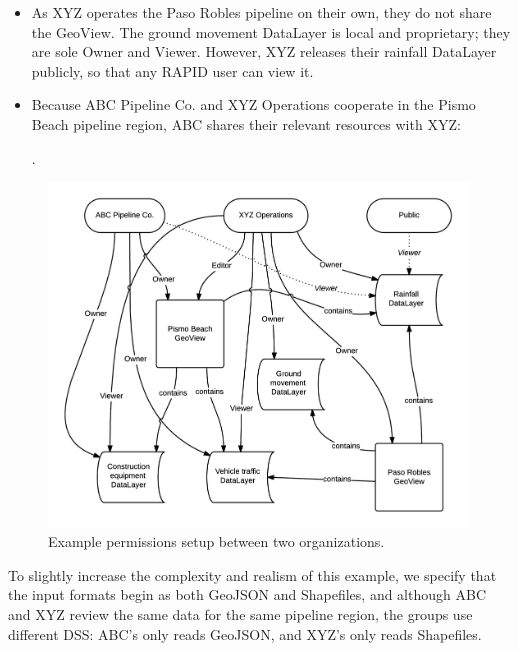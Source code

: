 \begin{itemize}
\item As XYZ operates the Paso Robles pipeline on their own, they do not share the GeoView. The ground movement DataLayer is local and proprietary; they are sole Owner and Viewer. However, XYZ releases their rainfall DataLayer publicly, so that any RAPID user can view it.
\item Because ABC Pipeline Co. and XYZ Operations cooperate in the Pismo Beach pipeline region, ABC shares their relevant resources with XYZ: .
\end{itemize}
 

\begin{figure}[ht]
    \centering
    \includegraphics[width=0.99\textwidth]{figures/permissions.png}
    \caption{Example permissions setup between two organizations.}
    \label{fig:permissions}
\end{figure}

To slightly increase the complexity and realism of this example, we specify that the input formats begin as both GeoJSON and Shapefiles, and although ABC and XYZ review the same data for the same pipeline region, the groups use different DSS: ABC's only reads GeoJSON, and XYZ's only reads Shapefiles.

